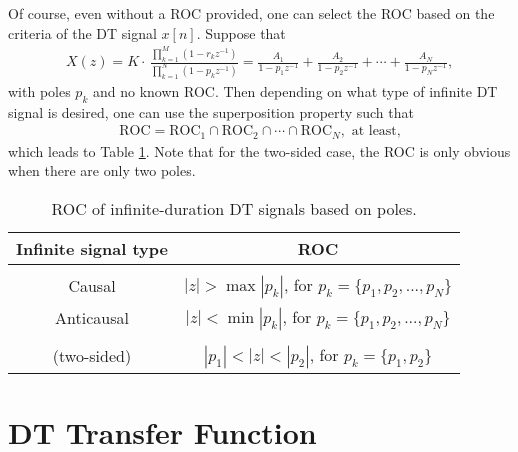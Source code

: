 \documentclass{report}
\begin{document}
Of course, even without a ROC provided, one can select the ROC based on the criteria of the DT signal $x[n]$. Suppose that 
\begin{align}
    X(z) = K\cdot\, \frac{\displaystyle\prod_{k=1}^{M}(1-r_kz^{-1})}{\displaystyle\prod_{k=1}^{N}(1-p_kz^{-1})} = \frac{A_1}{1-p_1z^{-1}} + \frac{A_2}{1-p_2z^{-1}} + \cdots + \frac{A_N}{1-p_Nz^{-1}},
\end{align}
with poles $p_k$ and no known ROC. Then depending on what type of infinite DT signal is desired, one can use the superposition property such that 
\begin{align}
    \text{ROC} = \text{ROC}_1 \cap \text{ROC}_2 \cap \cdots \cap \text{ROC}_N, \text{ at least,}
\end{align}
which leads to Table \ref{roc_poles}. Note that for the two-sided case, the ROC is only obvious when there are only two poles.

\begin{table}[hbt!]
    \centering
    \caption{ROC of infinite-duration DT signals based on poles.}
    \label{roc_poles}
    \begin{tabular}{|c|c|}
        \hline
        Infinite signal type & ROC \\[0.15cm]
        \hline
        & \\
        Causal & $|z|>\max|p_k|$, for $p_k=\{p_1,p_2,...,p_N\}$ \\[0.5cm]
        Anticausal & $|z|<\min|p_k|$, for $p_k=\{p_1,p_2,...,p_N\}$ \\[0.5cm]
        \Centerstack{Noncausal\\(two-sided)} & $|p_1|<|z|<|p_2|$, for $p_k=\{p_1,p_2\}$ \\[0.5cm]
        \hline
    \end{tabular}
\end{table}

\section{DT Transfer Function}
\end{document}
